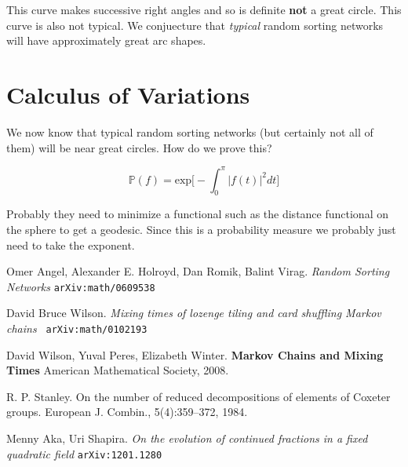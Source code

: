 \documentclass[12pt]{article}
\begin{document}
{\noindent This curve makes successive right angles and so is definite \textbf{not} a great circle.  This curve is also not typical.  We conjuecture that \textit{typical} random sorting networks will have approximately great arc shapes.  

\section{Calculus of Variations}

We now know that typical random sorting networks (but certainly not all of them) will be near great circles.  How do we prove this? 

$$  \mathbb{P}(f) = \mathrm{exp} \bigg[- \int_0^\pi |f(t)|^2 dt \bigg]$$

\noindent Probably they need to minimize a functional such as the distance functional on the sphere to get a geodesic.  Since this is a probability measure we probably just need to take the exponent. \newline


\begin{thebibliography}{9}

Omer Angel, Alexander E. Holroyd, Dan Romik, Balint Virag. \newline \textit{Random Sorting Networks}   \texttt{arXiv:math/0609538} 

David Bruce Wilson.
 \textit{Mixing times of lozenge tiling and card shuffling Markov chains } \texttt{ arXiv:math/0102193}
 
David Wilson, Yuval Peres, Elizabeth Winter. \textbf{Markov Chains and Mixing Times} \newline American Mathematical Society, 2008. 

R. P. Stanley. On the number of reduced decompositions of elements of
Coxeter groups. European J. Combin., 5(4):359–372, 1984.
 
Menny Aka, Uri Shapira. \textit{On the evolution of continued fractions in a fixed quadratic field}  \texttt{arXiv:1201.1280}

\end{thebibliography}
}
\end{document}
